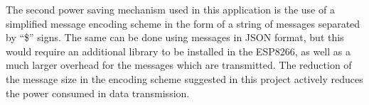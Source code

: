 The second power saving mechanism used in this application is the use of a simplified message encoding scheme in the form of a string of messages separated by “\$” signs. The same can be done using messages in JSON format, but this would require an additional library to be installed in the ESP8266, as well as a much larger overhead for the messages which are transmitted. The reduction of the message size in the encoding scheme suggested in this project actively reduces the power consumed in data transmission.
